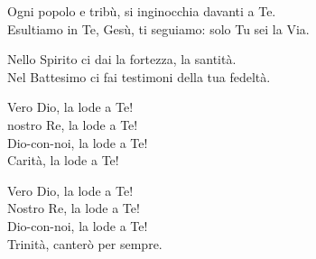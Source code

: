 
\strofa Ogni popolo e tribù, si inginocchia davanti a Te.\\
Esultiamo in Te, Gesù, ti seguiamo: solo Tu sei la Via.

\spazio


\spazio

\strofa Nello Spirito ci dai la fortezza, la santità.\\
Nel Battesimo ci fai testimoni della tua fedeltà.

\spazio

Vero Dio, la lode a Te!\\
nostro Re, la lode a Te!\\
Dio-con-noi, la lode a Te!\\
Carità, la lode a Te!

\spazio

Vero Dio, la lode a Te!\\
Nostro Re, la lode a Te!\\
Dio-con-noi, la lode a Te!\\
Trinità, canterò per sempre.